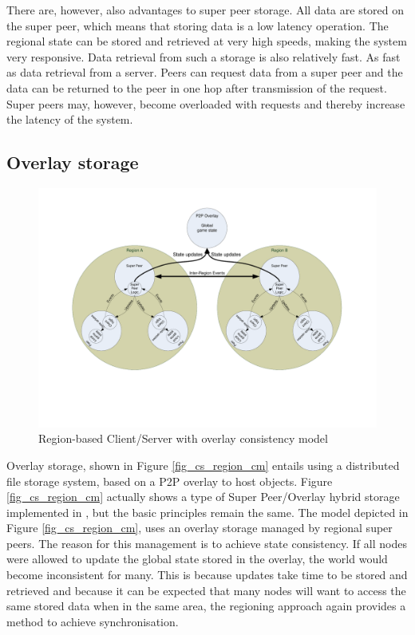 \documentclass[journal,oneside,a4paper,onecolumn]{IEEEtran}
\begin{document}
There are, however, also advantages to super peer storage. All data are stored on the super peer, which means that storing data is a low latency operation. The regional state can be stored and retrieved at very high speeds, making the system very responsive. Data retrieval from such a storage is also relatively fast. As fast as data retrieval from a server. Peers can request data from a super peer and the data can be returned to the peer in one hop after transmission of the request. Super peers may, however, become overloaded with requests and thereby increase the latency of the system.

\subsection{Overlay storage}
\label{overlay_storage}

\begin{figure}[htbp]
 \centering
 \includegraphics[clip=true, viewport=2cm 5cm 27cm 19.5cm, width=\columnwidth]{region_based_CS_CM_P2PO}
 \caption{Region-based Client/Server with overlay consistency model}
 \label{fig_cs_region_o_cm}
\end{figure}
%
Overlay storage, shown in Figure \ref{fig_cs_region_cm} entails using a distributed file storage system, based on a P2P overlay to host objects. Figure \ref{fig_cs_region_cm} actually shows a type of Super Peer/Overlay hybrid storage implemented in \cite{zoned_federation}, but the basic principles remain the same. The model depicted in Figure \ref{fig_cs_region_cm}, uses an overlay storage managed by regional super peers. The reason for this management is to achieve state consistency. If all nodes were allowed to update the global state stored in the overlay, the world would become inconsistent for many. This is because updates take time to be stored and retrieved and because it can be expected that many nodes will want to access the same stored data when in the same area, the regioning approach again provides a method to achieve synchronisation.
\end{document}
